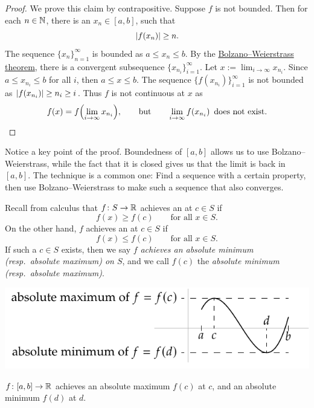 \begin{proof}
We prove this claim by contrapositive.  Suppose $f$ is not bounded.
Then for each
$n \in {\mathbb{N}}$, there is an $x_n \in [a,b]$, such that
\begin{equation*}
\left\lvert {f(x_n)} \right\rvert \geq n .
\end{equation*}
The sequence $\{ x_n \}_{n=1}^\infty$ is bounded as $a \leq x_n \leq b$.
By the \hyperref[thm:bwseq]{Bolzano--Weierstrass theorem},
there is a convergent subsequence $\{ x_{n_i} \}_{i=1}^\infty$.
Let $x := \lim_{i\to\infty} x_{n_i}$.
Since $a \leq x_{n_i} \leq b$ for all $i$, then $a \leq x \leq b$.
The sequence $\bigl\{ f(x_{n_i}) \bigr\}_{i=1}^\infty$ is not bounded 
as 
$\left\lvert {f(x_{n_i})} \right\rvert \geq n_i \geq i$.
Thus $f$ is not continuous at $x$ as
\begin{equation*}
f(x)
=
f\Bigl( \lim_{i\to\infty} x_{n_i} \Bigr) ,
\qquad \text{but} \qquad
\lim_{i\to\infty} f(x_{n_i}) \enspace \text{does not exist.} \qedhere
\end{equation*}
\end{proof}

Notice a key point of the proof.
Boundedness of $[a,b]$ allows us to use Bolzano--Weierstrass,
while the fact that it is closed gives us that the limit is back in $[a,b]$.
The technique is a common one: Find a sequence with a certain property,
then use Bolzano--Weierstrass to make such a sequence that also converges.

Recall from calculus that $f \colon S \to {\mathbb{R}}$ achieves an
\emph{}%
at $c \in S$ if
\begin{equation*}
f(x) \geq f(c) \qquad \text{for all } x \in S.
\end{equation*}
On the other hand, $f$ achieves an 
\emph{}%
at $c \in S$ if
\begin{equation*}
f(x) \leq f(c) \qquad \text{for all } x \in S.
\end{equation*}
If such a $c \in S$ exists, then we say
$f$ \emph{achieves an absolute minimum (resp.\ absolute maximum) on
$S$}, and we call
$f(c)$ the \emph{absolute minimum (resp.\ absolute maximum)}.
\begin{myfigureht}
\includegraphics{figures/minmax}
\caption{$f \colon [a,b] \to {\mathbb{R}}$ achieves an absolute maximum $f(c)$ at
$c$, and an absolute minimum $f(d)$ at $d$.\label{fig:minmax}}
\end{myfigureht}

